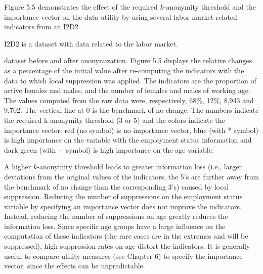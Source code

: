 \documentclass[letterpaper,10pt,english]{sphinxmanual}
\begin{document}
\begin{DUlineblock}{0em}
\item[] 
\item[] 
\item[] 
\item[] 
\item[] 
\end{DUlineblock}

Figure 5.5 demonstrates the effect of the required \(k\)-anonymity
threshold and the importance vector on the data utility by using several
labor market-related indicators from an I2D2 %
\begin{footnote}[8]\sphinxAtStartFootnote
I2D2 is a dataset with data related to the labor market.
%
\end{footnote}
dataset before and after anonymization. Figure 5.5 displays the relative
changes as a percentage of the initial value after re-computing the
indicators with the data to which local suppression was applied. The
indicators are the proportion of active females and males, and the
number of females and males of working age. The values computed from the
raw data were, respectively, 68\%, 12\%, 8,943 and 9,702. The vertical
line at 0 is the benchmark of no change. The numbers indicate the
required k-anonymity threshold (3 or 5) and the colors indicate the
importance vector: red (no symbol) is no importance vector, blue (with
* symbol) is high importance on the variable with the employment status
information and dark green (with + symbol) is high importance on the age
variable.

A higher \(k\)-anonymity threshold leads to greater information loss
(i.e., larger deviations from the original values of the indicators, the
5’s are further away from the benchmark of no change than the
corresponding 3’s) caused by local suppression. Reducing the number of
suppressions on the employment status variable by specifying an
importance vector does not improve the indicators. Instead, reducing the
number of suppressions on age greatly reduces the information loss.
Since specific age groups have a large influence on the computation of
these indicators (the rare cases are in the extremes and will be
suppressed), high suppression rates on age distort the indicators. It is
generally useful to compare utility measures (see Chapter 6) to specify
the importance vector, since the effects can be unpredictable.
\end{document}
